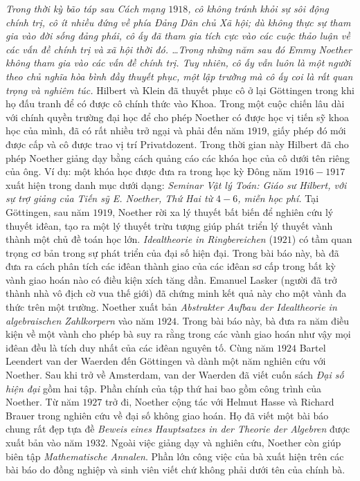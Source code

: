 \begin{multicols}{2}
	\vskip 0.05cm
	\textit{Trong thời kỳ bão táp sau Cách mạng $1918$, cô không tránh khỏi sự sôi động chính trị, cô ít nhiều đứng về phía Đảng Dân chủ Xã hội; dù không thực sự tham gia vào đời sống đảng phái, cô ấy đã tham gia tích cực vào các cuộc thảo luận về các vấn đề chính trị và xã hội thời đó. \ldots Trong những năm sau đó Emmy Noether không tham gia vào các vấn đề chính trị. Tuy nhiên, cô ấy vẫn luôn là một người theo chủ nghĩa hòa bình đầy thuyết phục, một lập trường mà cô ấy coi là rất quan trọng và nghiêm túc.}
	\vskip 0.05cm
	Hilbert và Klein đã thuyết phục cô ở lại Göttingen trong khi họ đấu tranh để có được cô chính thức vào Khoa. Trong một cuộc chiến lâu dài với chính quyền trường đại học để cho phép Noether có được học vị tiến sỹ khoa học của mình, đã có rất nhiều trở ngại và phải đến năm $1919$, giấy phép đó mới được cấp và cô được trao vị trí Privatdozent. Trong thời gian này Hilbert đã cho phép Noether giảng dạy bằng cách quảng cáo các khóa học của cô dưới tên riêng của ông. Ví dụ: một khóa học được đưa ra trong học kỳ Đông năm $1916-1917$ xuất hiện trong danh mục dưới dạng:
	\vskip 0.05cm
	\textit{Seminar Vật lý Toán: Giáo sư Hilbert, với sự trợ giảng của Tiến sỹ E. Noether, Thứ Hai từ $4-6$, miễn học phí.}
	\vskip 0.05cm
	Tại Göttingen, sau năm $1919$, Noether rời xa lý thuyết bất biến để nghiên cứu lý thuyết iđêan, tạo ra một lý thuyết trừu tượng giúp phát triển lý thuyết vành thành một chủ đề toán học lớn. \textit{Idealtheorie in Ringbereichen} ($1921$) có tầm quan trọng cơ bản trong sự phát triển của đại số hiện đại. Trong bài báo này, bà đã đưa ra cách phân tích các iđêan thành giao của các iđêan sơ cấp trong bất kỳ vành giao hoán nào có điều kiện xích tăng dần. Emanuel Lasker (người đã trở thành nhà vô địch cờ vua thế giới) đã chứng minh kết quả này cho một vành đa thức trên một trường. Noether xuất bản \textit{Abstrakter Aufbau der Idealtheorie in algebraischen Zahlkorpern} vào năm $1924$. Trong bài báo này, bà đưa ra năm điều kiện về một vành cho phép bà suy ra rằng trong các vành giao hoán như vậy mọi iđêan đều là tích duy nhất của các iđêan nguyên tố.
	\vskip 0.05cm
	Cùng năm $1924$ Bartel Leendert  van der Waerden đến Göttingen và dành một năm nghiên cứu với Noether. Sau khi trở về Amsterdam, van der Waerden đã viết cuốn sách \textit{Đại số hiện đại} gồm hai tập. Phần chính của tập thứ hai bao gồm công trình của Noether. Từ năm $1927$ trở đi, Noether cộng tác với Helmut Hasse và Richard Brauer trong nghiên cứu về đại số không giao hoán. Họ đã viết một bài báo chung rất đẹp tựa đề \textit{Beweis eines Hauptsatzes in der Theorie der Algebren} được xuất bản vào năm $1932$. Ngoài việc giảng dạy và nghiên cứu, Noether còn giúp biên tập \textit{Mathematische Annalen}. Phần lớn công việc của bà xuất hiện trên các bài báo do đồng nghiệp và sinh viên viết chứ không phải dưới tên của chính bà.

\end{multicols}
